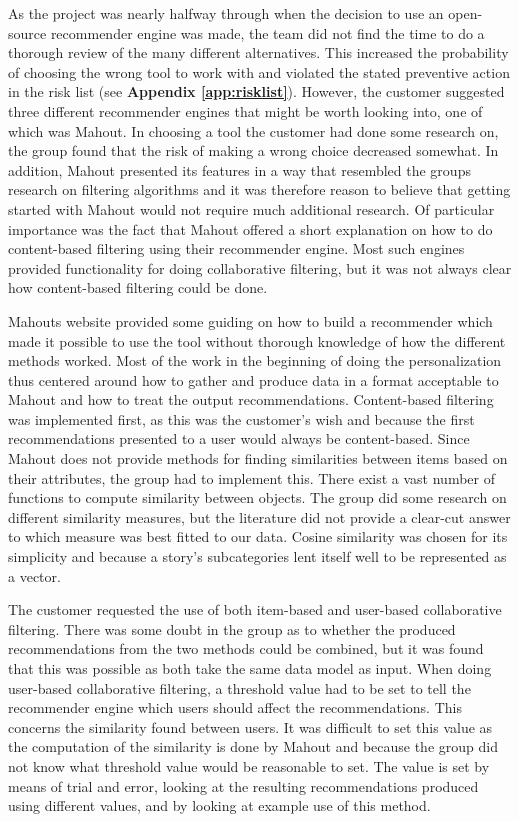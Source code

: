 As the project was nearly halfway through when the decision to use an open-source recommender engine was made, the team did not find the time to do a thorough review of the many different alternatives. This increased the probability of choosing the wrong tool to work with and violated the stated preventive action in the risk list (see \textbf{Appendix \ref{app:risklist}}). However, the customer suggested three different recommender engines that might be worth looking into, one of which was Mahout. In choosing a tool the customer had done some research on, the group found that the risk of making a wrong choice decreased somewhat. In addition, Mahout presented its features in a way that resembled the groups research on filtering algorithms and it was therefore reason to believe that getting started with Mahout would not require much additional research. Of particular importance was the fact that Mahout offered a short explanation on how to do content-based filtering using their recommender engine. Most such engines provided functionality for doing collaborative filtering, but it was not always clear how content-based filtering could be done.\newline

Mahouts website provided some guiding on how to build a recommender which made it possible to use the tool without thorough knowledge of how the different methods worked. Most of the work in the beginning of doing the personalization thus centered around how to gather and produce data in a format acceptable to Mahout and how to treat the output recommendations. Content-based filtering was implemented first, as this was the customer's wish and because the first recommendations presented to a user would always be content-based. Since Mahout does not provide methods for finding similarities between items based on their attributes, the group had to implement this. There exist a vast number of functions to compute similarity between objects. The group did some research on different similarity measures, but the literature did not provide a clear-cut answer to which measure was best fitted to our data. Cosine similarity was chosen for its simplicity and because a story's subcategories lent itself well to be represented as a vector.\newline

The customer requested the use of both item-based and user-based collaborative filtering. There was some doubt in the group as to whether the produced recommendations from the two methods could be combined, but it was found that this was possible as both take the same data model as input. When doing user-based collaborative filtering, a threshold value had to be set to tell the recommender engine which users should affect the recommendations. This concerns the similarity found between users. It was difficult to set this value as the computation of the similarity is done by Mahout and because the group did not know what threshold value would be reasonable to set. The value is set by means of trial and error, looking at the resulting recommendations produced using different values, and by looking at example use of this method. \newline

